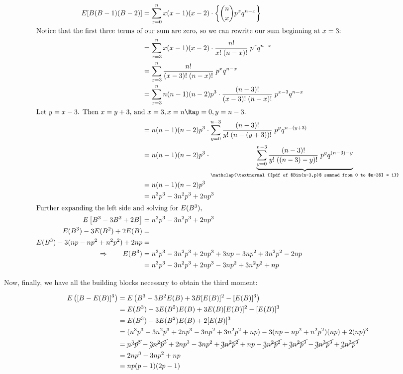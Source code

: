 \documentclass{article}
\begin{document}
\begin{align*}
  E[B(B-1)(B-2)] &= \sum_{x=0}^n x (x-1) (x-2) \cdot \left\{ \binom{n}{x} p^x q^{n-x} \right\} \\
  \intertext{Notice that the first three terms of our sum are zero, so we can rewrite our sum beginning at $x = 3$:}
  &= \sum_{x=3}^n x(x-1)(x-2) \cdot \frac{n!}{x!\;(n-x)!} \; p^x q^{n-x} \\
  &= \sum_{x=3}^n \frac{n!}{(x-3)!\;(n-x)!} \; p^x q^{n-x} \\
  &= \sum_{x=3}^n n(n-1)(n-2) p^3 \cdot \frac{(n-3)!}{(x-3)!\;(n-x)!} \; p^{x-3}q^{n-x} \\
  \intertext{Let $y=x-3$. Then $x=y+3$, and $x=3, x=n \Ra y=0, y=n-3$.}
  &= n(n-1)(n-2)p^3 \cdot \sum_{y=0}^{n-3} \frac{(n-3)!}{y!\;(n-(y+3))!} \; p^y q^{n-(y+3)} \\
  &= n(n-1)(n-2)p^3 \cdot \underbrace {\sum_{y=0}^{n-3} \frac{(n-3)!}{y!\;((n-3)-y)!} \; p^y q^{(n-3)-y}}_{\mathclap{\textnormal{[pdf of $Bin(n-3,p)$ summed from 0 to $n-3$] = 1}}} \\
  &= n(n-1)(n-2)p^3 \\
  &= n^3p^3 - 3n^2p^3 + 2np^3 \\
  \intertext{Further expanding the left side and solving for $E(B^3)$,}
  E \left[ B^3 - 3B^2 + 2B \right] &= n^3p^3 - 3n^2p^3 + 2np^3 \\
  E(B^3) - 3E(B^2) + 2E(B) &= \\
  E(B^3) - 3(np - np^2 + n^2p^2) + 2np &= \\
  \Rightarrow \qquad E(B^3) &= n^3p^3 - 3n^2p^3 + 2np^3 + 3np - 3np^2 + 3n^2p^2 - 2np \\
  &= n^3p^3 - 3n^2p^3 + 2np^3 - 3np^2 + 3n^2p^2 + np
\end{align*}

Now, finally, we have all the building blocks necessary to obtain the third
moment:

\begin{align*}
  E \left( [B - E(B)]^3 \right) &= E \left( B^3 - 3B^2 E(B) + 3B [E(B)]^2 - [E(B)]^3 \right) \\
  &= E(B^3) - 3 E(B^2) E(B) + 3 E(B) [E(B)]^2 - [E(B)]^3 \\
  &= E(B^3) - 3 E(B^2) E(B) + 2 [E(B)]^3 \\
  &= (n^3p^3 - 3n^2p^3 + 2np^3 - 3np^2 + 3n^2p^2 + np) - 3(np - np^2 + n^2p^2)(np) + 2(np)^3 \\
  &= \cancel{n^3p^3} - \cancel{3n^2p^3} + 2np^3 - 3np^2 + \cancel{3n^2p^2} + np - \cancel{3n^2p^2} + \cancel{3n^2p^3} - \cancel{3n^3p^3} + \cancel{2n^3p^3} \\
  &= 2np^3 - 3np^2 + np \\
  &= np(p-1)(2p-1)
\end{align*}
\end{document}

